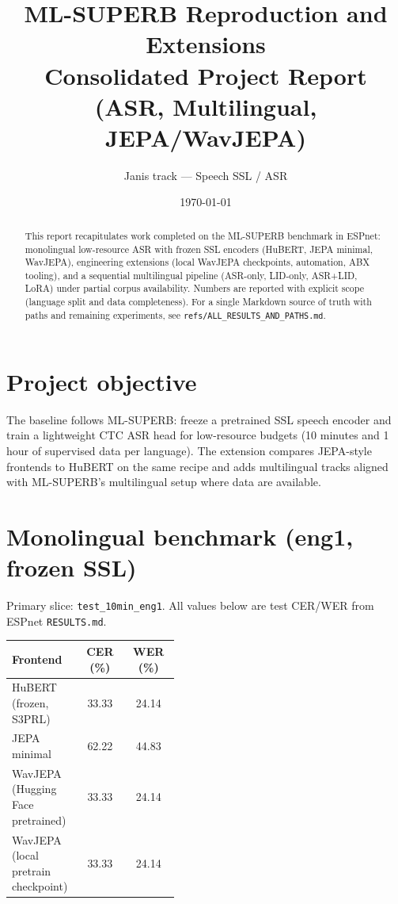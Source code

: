 \documentclass[11pt,a4paper]{article}
\title{ML-SUPERB Reproduction and Extensions\\
\large Consolidated Project Report (ASR, Multilingual, JEPA/WavJEPA)}
\author{Janis track --- Speech SSL / ASR}
\date{\today}
\begin{document}
\maketitle

\begin{abstract}
This report recapitulates work completed on the ML-SUPERB benchmark in ESPnet: monolingual low-resource ASR with frozen SSL encoders (HuBERT, JEPA minimal, WavJEPA), engineering extensions (local WavJEPA checkpoints, automation, ABX tooling), and a sequential multilingual pipeline (ASR-only, LID-only, ASR+LID, LoRA) under partial corpus availability. Numbers are reported with explicit scope (language split and data completeness). For a single Markdown source of truth with paths and remaining experiments, see \texttt{refs/ALL\_RESULTS\_AND\_PATHS.md}.
\end{abstract}

\section{Project objective}
The baseline follows ML-SUPERB: freeze a pretrained SSL speech encoder and train a lightweight CTC ASR head for low-resource budgets (10 minutes and 1 hour of supervised data per language). The extension compares JEPA-style frontends to HuBERT on the same recipe and adds multilingual tracks aligned with ML-SUPERB's multilingual setup where data are available.

\section{Monolingual benchmark (eng1, frozen SSL)}
Primary slice: \texttt{test\_10min\_eng1}. All values below are test CER/WER from ESPnet \texttt{RESULTS.md}.

\begin{center}
\begin{tabular}{>{\raggedright\arraybackslash}p{0.42\linewidth}cc}
\toprule
\textbf{Frontend} & \textbf{CER (\%)} & \textbf{WER (\%)} \\
\midrule
HuBERT (frozen, S3PRL) & 33.33 & 24.14 \\
JEPA minimal & 62.22 & 44.83 \\
WavJEPA (Hugging Face pretrained) & 33.33 & 24.14 \\
WavJEPA (local pretrain checkpoint) & 33.33 & 24.14 \\
\bottomrule
\end{tabular}
\end{center}
\end{document}
